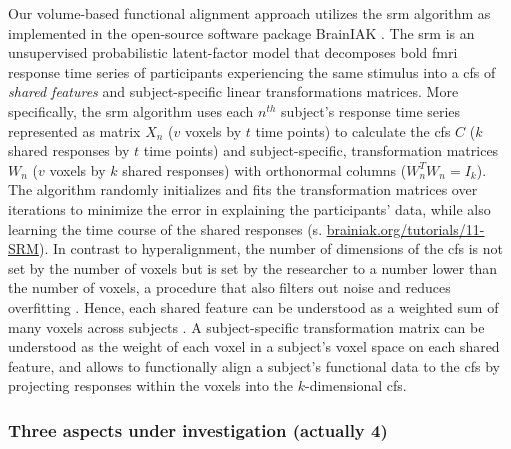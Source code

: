 Our volume-based functional alignment approach utilizes the \ac{srm} algorithm
\citep{chen2015reduced, richard2019fast} as implemented in the open-source
software package BrainIAK \citep[Brain Imaging Analysis Kit;
\href{https://brainiak.org}{\url{brainiak.org}};][]{kumar2020brainiak,
kumar2020brainiaktutorial}.
The \ac{srm} is an unsupervised probabilistic latent-factor model that
decomposes \ac{bold} \ac{fmri} response time series of participants experiencing
the same stimulus into a \ac{cfs} of \textit{shared features} \citep[also called
``\textit{shared feature space}'';][]{chen2015reduced} and subject-specific
linear transformations matrices.
More specifically, the \ac{srm} algorithm uses each $n^{th}$ subject's response
time series represented as matrix $X_{n}$ ({$v$} voxels by $t$ time points) to
calculate the \ac{cfs} $C$ ($k$ shared responses by $t$ time points) and
subject-specific, transformation matrices $W_{n}$ ($v$ voxels by $k$ shared
responses) with orthonormal columns ($W_{n}^{T}W_{n}=I_{k}$).
The algorithm randomly initializes and fits the transformation matrices over
iterations to minimize the error in explaining the participants' data, while
also learning the time course of the shared responses (s.
\href{https://brainiak.org/tutorials/11-SRM/}{\url{brainiak.org/tutorials/11-SRM}}).
In contrast to hyperalignment, the number of dimensions of the \ac{cfs} is not
set by the number of voxels but is set by the researcher to a number lower than
the number of voxels, a procedure that also filters out noise and reduces
overfitting \citep{chen2015reduced}.
Hence, each shared feature can be understood as a weighted sum of many voxels
across subjects \citep{kumar2020brainiak}.
A subject-specific transformation matrix can be understood as the weight of each
voxel in a subject's voxel space on each shared feature, and allows to
functionally align a subject's functional data to the \ac{cfs} by projecting
responses within the voxels into the $k$-dimensional \ac{cfs}.



\subsubsection{Three aspects under investigation (actually 4)}


